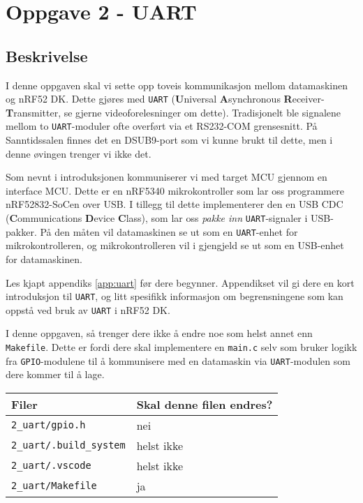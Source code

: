 \section{Oppgave 2 - UART}\label{sec:4-oppgave-UART}

\subsection{Beskrivelse}

I denne oppgaven skal vi sette opp toveis kommunikasjon mellom datamaskinen og nRF52 DK. Dette gjøres med \verb|UART| (\textbf{U}niversal \textbf{A}synchronous \textbf{R}eceiver-\textbf{T}ransmitter, se gjerne videoforelesninger om dette). Tradisjonelt ble signalene mellom to \verb|UART|-moduler ofte overført via et RS232-COM grensesnitt. På Sanntidssalen finnes det en DSUB9-port som vi kunne brukt til dette, men i denne øvingen trenger vi ikke det. 

Som nevnt i introduksjonen kommuniserer vi med target MCU gjennom en interface MCU. Dette er en nRF5340 mikrokontroller som lar oss programmere nRF52832-SoCen over USB. I tillegg til dette implementerer den en USB CDC (\textbf{C}ommunications \textbf{D}evice \textbf{C}lass), som lar oss \textit{pakke inn} \verb|UART|-signaler i USB-pakker. På den måten vil datamaskinen se ut som en \verb|UART|-enhet for mikrokontrolleren, og mikrokontrolleren vil i gjengjeld se ut som en USB-enhet for datamaskinen.

Les kjapt appendiks \ref{app:uart} før dere begynner. Appendikset vil gi dere en kort introduksjon til \verb|UART|, og litt spesifikk informasjon om begrensningene som kan oppstå ved bruk av \verb|UART| i nRF52 DK.

I denne oppgaven, så trenger dere ikke å endre noe som helst annet enn \verb|Makefile|. Dette er fordi dere skal implementere en \verb|main.c| selv som bruker logikk fra \verb|GPIO|-modulene til å kommunisere med en datamaskin via \verb|UART|-modulen som dere kommer til å lage.

\begin{center}
 \begin{tabular}{|p{8.5cm} p{5.5cm}|} 
 \hline
 Filer & Skal denne filen endres?  \\ [0.5ex] 
 \hline\hline
  \verb|2_uart/gpio.h| & \quad \quad \quad \quad nei  \\ 
  \hline
  \verb|2_uart/.build_system| &  \quad \quad \quad \quad helst ikke \\ 
  \hline
    \verb|2_uart/.vscode| &  \quad \quad \quad \quad helst ikke \\ 
 \hline
 \verb|2_uart/Makefile| &  \quad \quad \quad \quad ja \\ 
 \hline
\end{tabular}
\end{center}


